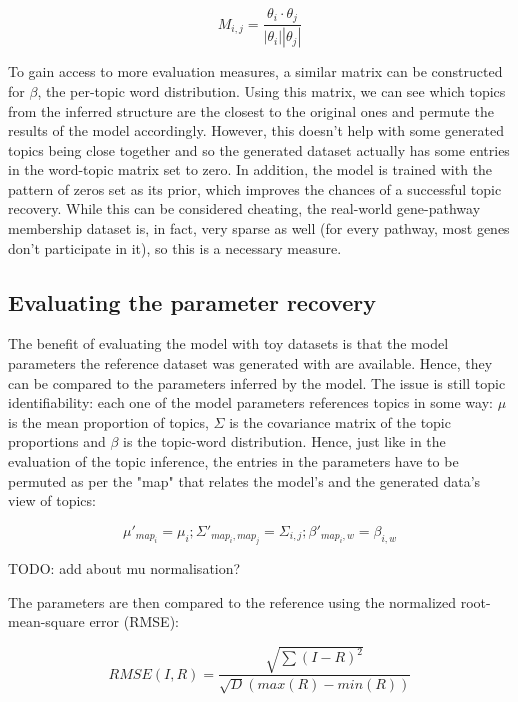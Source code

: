 \documentclass[12pt,a4paper,twoside,openright]{report}
\begin{document}
\begin{equation}
M_{i,j} = \frac{\theta_i \cdot \theta_j}{|\theta_i||\theta_j|}
\end{equation}

To gain access to more evaluation measures, a similar matrix can be constructed for $\beta$, the per-topic word distribution. Using this matrix, we can see which topics from the inferred structure are the closest to the original ones and permute the results of the model accordingly. However, this doesn't help with some generated topics being close together and so the generated dataset actually has some entries in the word-topic matrix set to zero. In addition, the model is trained with the pattern of zeros set as its prior, which improves the chances of a successful topic recovery. While this can be considered cheating, the real-world gene-pathway membership dataset is, in fact, very sparse as well (for every pathway, most genes don't participate in it), so this is a necessary measure.

\subsection{Evaluating the parameter recovery}

The benefit of evaluating the model with toy datasets is that the model parameters the reference dataset was generated with are available. Hence, they can be compared to the parameters inferred by the model. The issue is still topic identifiability: each one of the model parameters references topics in some way: $\mu$ is the mean proportion of topics, $\Sigma$ is the covariance matrix of the topic proportions and $\beta$ is the topic-word distribution. Hence, just like in the evaluation of the topic inference, the entries in the parameters have to be permuted as per the "map" that relates the model's and the generated data's view of topics:

\begin{equation}
\mu'_{map_i} = \mu_i;
\Sigma'_{map_i, map_j} = \Sigma_{i, j};
\beta'_{map_i, w} = \beta_{i, w}
\end{equation}

TODO: add about mu normalisation?

The parameters are then compared to the reference using the normalized root-mean-square error (RMSE):

\begin{equation}
RMSE(I, R) = \frac{\sqrt{\sum{(I-R)^2}}}{\sqrt{D}(max(R) - min(R))}
\end{equation}
\end{document}
